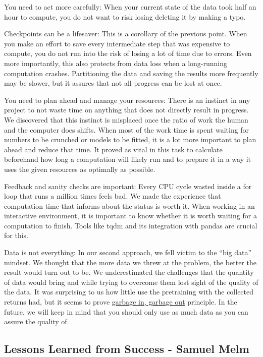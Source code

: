 \documentclass{article}
\begin{document}
You need to act more carefully: When your current state of the data took half an hour to compute, you do not want to risk losing deleting it by making a typo.  

Checkpoints can be a lifesaver: This is a corollary of the previous point. When you make an effort to save every intermediate step that was expensive to compute, you do not run into the risk of losing a lot of time due to errors. Even more importantly, this also protects from data loss when a long-running computation crashes. Partitioning the data and saving the results more frequently may be slower, but it assures that not all progress can be lost at once.


You need to plan ahead and manage your resources: There is an instinct in any project to not waste time on anything that does not directly result in progress. We discovered that this instinct is misplaced once the ratio of work the human and the computer does shifts. When most of the work time is spent waiting for numbers to be crunched or models to be fitted, it is a lot more important to plan ahead and reduce that time. It proved as vital in this task to calculate beforehand how long a computation will likely run and to prepare it in a way it uses the given resources as optimally as possible.

Feedback and sanity checks are important: Every CPU cycle wasted inside a for loop that runs a million times feels bad. We made the experience that computation time that informs about the status is worth it. When working in an interactive environment, it is important to know whether it is worth waiting for a computation to finish. Tools like tqdm and its integration with pandas are crucial for this.

Data is not everything: In our second approach, we fell victim to the “big data” mindset. We thought that the more data we threw at the problem, the better the result would turn out to be. We underestimated the challenges that the quantity of data would bring and while trying to overcome them lost sight of the quality of the data. It was surprising to us how little use the pretraining with the collected returns had, but it seems to prove \href{https://en.wikipedia.org/wiki/Garbage_in,_garbage_out}{garbage in, garbage out} principle. In the future, we will keep in mind that you should only use as much data as you can assure the quality of.

\subsection[Lessons Learned from Success]{Lessons Learned from Success {\small - Samuel Melm}}
\end{document}
